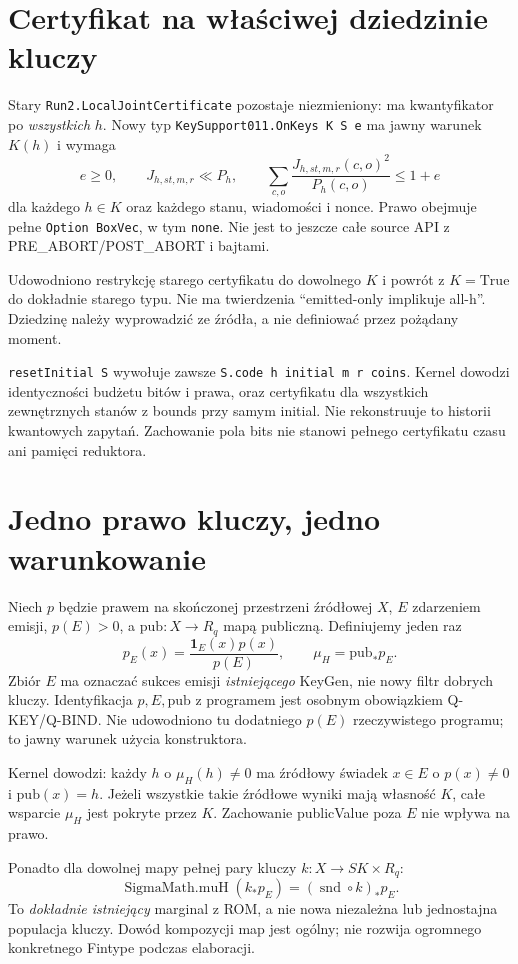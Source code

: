 \documentclass[11pt,a4paper]{article}
\newcommand{\code}[1]{\nolinkurl{#1}}
\begin{document}
\section{Certyfikat na właściwej dziedzinie kluczy}
Stary \code{Run2.LocalJointCertificate} pozostaje niezmieniony:
ma kwantyfikator po \emph{wszystkich} $h$. Nowy typ
\code{KeySupport011.OnKeys K S e} ma jawny warunek $K(h)$ i wymaga
\[
 e\ge0,\qquad J_{h,st,m,r}\ll P_h,\qquad
 \sum_{c,o}\frac{J_{h,st,m,r}(c,o)^2}{P_h(c,o)}\le1+e
\]
dla każdego $h\in K$ oraz każdego stanu, wiadomości i nonce.
Prawo obejmuje pełne \code{Option BoxVec}, w tym \code{none}.
Nie jest to jeszcze całe source API z PRE\_ABORT/POST\_ABORT i bajtami.

Udowodniono restrykcję starego certyfikatu do dowolnego $K$ i powrót
z $K=\mathrm{True}$ do dokładnie starego typu. Nie ma twierdzenia
``emitted-only implikuje all-h''. Dziedzinę należy wyprowadzić ze źródła,
a nie definiować przez pożądany moment.

\code{resetInitial S} wywołuje zawsze \code{S.code h initial m r coins}.
Kernel dowodzi identyczności budżetu bitów i prawa, oraz certyfikatu dla
wszystkich zewnętrznych stanów z bounds przy samym initial.
Nie rekonstruuje to historii kwantowych zapytań. Zachowanie pola bits nie
stanowi pełnego certyfikatu czasu ani pamięci reduktora.

\section{Jedno prawo kluczy, jedno warunkowanie}
Niech $p$ będzie prawem na skończonej przestrzeni źródłowej $X$,
$E$ zdarzeniem emisji, $p(E)>0$, a $\mathrm{pub}:X\to R_q$ mapą publiczną.
Definiujemy jeden raz
\[
 p_E(x)=\frac{\mathbf1_E(x)p(x)}{p(E)},\qquad
 \mu_H=\mathrm{pub}_*p_E.
\]
Zbiór $E$ ma oznaczać sukces emisji \emph{istniejącego} KeyGen, nie nowy
filtr dobrych kluczy. Identyfikacja $p,E,\mathrm{pub}$ z programem jest
osobnym obowiązkiem Q-KEY/Q-BIND. Nie udowodniono tu dodatniego $p(E)$
rzeczywistego programu; to jawny warunek użycia konstruktora.

Kernel dowodzi: każdy $h$ o $\mu_H(h)\ne0$ ma źródłowy świadek
$x\in E$ o $p(x)\ne0$ i $\mathrm{pub}(x)=h$. Jeżeli wszystkie takie
źródłowe wyniki mają własność $K$, całe wsparcie $\mu_H$ jest pokryte przez $K$.
Zachowanie publicValue poza $E$ nie wpływa na prawo.

Ponadto dla dowolnej mapy pełnej pary kluczy $k:X\to SK\times R_q$:
\[
 \operatorname{SigmaMath.muH}(k_*p_E)
 = (\operatorname{snd}\circ k)_*p_E.
\]
To \emph{dokładnie istniejący} marginal z ROM, a nie nowa niezależna
lub jednostajna populacja kluczy. Dowód kompozycji map jest ogólny;
nie rozwija ogromnego konkretnego Fintype podczas elaboracji.
\end{document}
